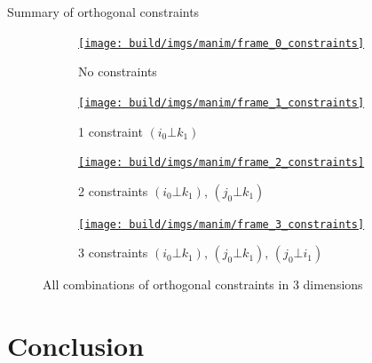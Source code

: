 \documentclass[10pt, xcolor={usenames, dvipsnames}]{beamer}
\begin{document}
        \begin{frame}{Summary of orthogonal constraints}
            \begin{figure}
                \begin{subfigure}[t]{0.24\textwidth}
                    \centering
                    \href{run:frame_0_constraints.mp4?autostart&loop}{\texttt{[image: build/imgs/manim/frame\_0\_constraints]}}
                    \caption{No constraints}
                    \label{fig:constraints_0}
                \end{subfigure}
                \hfill
                \begin{subfigure}[t]{0.24\textwidth}
                    \centering
                    \href{run:frame_1_constraints.mp4?autostart&loop}{\texttt{[image: build/imgs/manim/frame\_1\_constraints]}}
                    \caption{1 constraint $(i_0 \bot k_1)$}
                    \label{fig:constraints_1}
                \end{subfigure}
                \hfill
                \begin{subfigure}[t]{0.24\textwidth}
                    \centering
                    \href{run:frame_2_constraints.mp4?autostart&loop}{\texttt{[image: build/imgs/manim/frame\_2\_constraints]}}
                    \caption{2 constraints $(i_0 \bot k_1)$, $(j_0 \bot k_1)$}
                    \label{fig:constraints_2}
                \end{subfigure}
                \hfill
                \begin{subfigure}[t]{0.24\textwidth}
                    \centering
                    \href{run:frame_3_constraints.mp4?autostart&loop}{\texttt{[image: build/imgs/manim/frame\_3\_constraints]}}
                    \caption{3 constraints $(i_0 \bot k_1)$, $(j_0 \bot k_1)$, $(j_0 \bot i_1)$}
                    \label{fig:constraints_3}
                \end{subfigure}
                \caption{All combinations of orthogonal constraints in 3 dimensions}
            \end{figure}
        \end{frame}
        
    \section{Conclusion}
\end{document}
